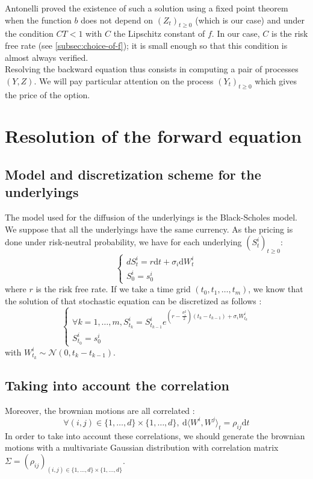 \documentclass[a4paper,11pt,english]{book}
\begin{document}
Antonelli \cite{antonelli1993backward} proved the existence of such a solution using a fixed point theorem when the function $b$ does not depend on $(Z_{t})_{t\geq0}$ (which is our case) and under the condition $CT<1$ with $C$ the Lipschitz constant of $f$. In our case, $C$ is the risk free rate (see \ref{subsec:choice-of-f}); it is small enough so that this condition is almost always verified.\\

Resolving the backward equation thus consists in computing a pair of processes $(Y,Z)$. We will pay particular attention on the process $(Y_{t})_{t\geq0}$ which gives the price of the option.

\section{Resolution of the forward equation}
\subsection{Model and discretization scheme for the underlyings}
\label{subsec:underlying-discretization}
The model used for the diffusion of the underlyings is the Black-Scholes model. We suppose that all the underlyings have the same currency. As the pricing is done under risk-neutral probability, we have for each underlying $(S^{i}_{t})_{t\geq0}$:
$$
\begin{cases}
dS_{t}^{i}=r\text{d}t+\sigma_{i}\text{d}W_{t}^{i} \\
S_{0}^{i}=s_{0}^{i} 
\end{cases}
$$
where $r$ is the risk free rate.
If we take a time grid $(t_{0},t_{1},\ldots,t_{m})$, we know that the solution of that stochastic equation can be discretized as follows :
$$\begin{cases}
\forall k=1,\ldots,m,  S_{t_{k}}^{i}=S_{t_{k-1}}^{i}e^{(r-\frac{\sigma_{i}^{2}}{2})(t_{k}-t_{k-1})+\sigma_{i}W_{t_{k}}^{i}}\\
S_{t_{0}}^{i}=s_{0}^{i} 
\end{cases}
$$
with $W_{t_{k}}^{i} \sim \mathcal{N}(0,t_{k}-t_{k-1})$.\\

\subsection{Taking into account the correlation}
Moreover, the brownian motions are all correlated : $$\forall (i,j) \in \{1,\ldots,d\}\times\{1,\ldots,d\},~ \text{d}\langle W^{i},W^{j}\rangle_t=\rho_{ij}\text{d}t$$
In order to take into account these correlations, we should generate the brownian motions with a multivariate Gaussian distribution with correlation matrix $\Sigma=(\rho_{ij})_{(i,j) \in \{1,\ldots,d\}\times\{1,\ldots,d\}}$.\\
\end{document}
